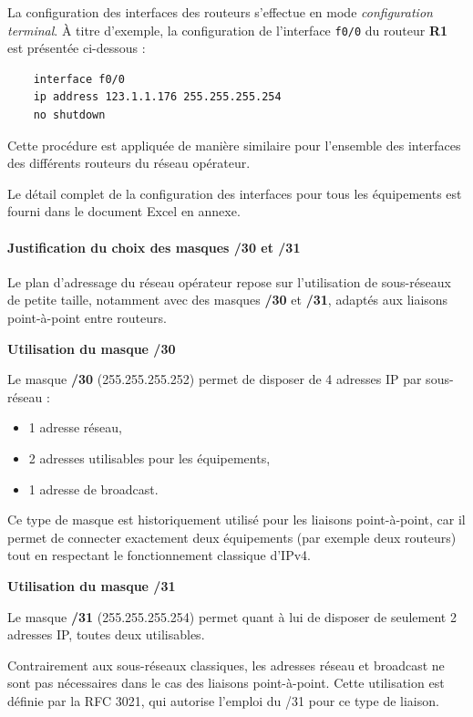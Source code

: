 \documentclass[12pt,a4paper, oneside]{memoir}
\begin{document}
La configuration des interfaces des routeurs s’effectue en mode \textit{configuration terminal}. À titre d’exemple, la configuration de l’interface \texttt{f0/0} du routeur \textbf{R1} est présentée ci-dessous :

\begin{verbatim}
	interface f0/0 
	ip address 123.1.1.176 255.255.255.254 
	no shutdown
\end{verbatim}

Cette procédure est appliquée de manière similaire pour l’ensemble des interfaces des différents routeurs du réseau opérateur.

Le détail complet de la configuration des interfaces pour tous les équipements est fourni dans le document Excel en annexe.
\paragraph{Justification du choix des masques /30 et /31}

Le plan d’adressage du réseau opérateur repose sur l’utilisation de sous-réseaux de petite taille, notamment avec des masques \textbf{/30} et \textbf{/31}, adaptés aux liaisons point-à-point entre routeurs.

\textbf{Utilisation du masque /30}

Le masque \textbf{/30} (255.255.255.252) permet de disposer de 4 adresses IP par sous-réseau :
\begin{itemize}
	\item 1 adresse réseau,
	\item 2 adresses utilisables pour les équipements,
	\item 1 adresse de broadcast.
\end{itemize}

Ce type de masque est historiquement utilisé pour les liaisons point-à-point, car il permet de connecter exactement deux équipements (par exemple deux routeurs) tout en respectant le fonctionnement classique d’IPv4.

\textbf{Utilisation du masque /31}

Le masque \textbf{/31} (255.255.255.254) permet quant à lui de disposer de seulement 2 adresses IP, toutes deux utilisables.

Contrairement aux sous-réseaux classiques, les adresses réseau et broadcast ne sont pas nécessaires dans le cas des liaisons point-à-point. Cette utilisation est définie par la RFC 3021, qui autorise l’emploi du /31 pour ce type de liaison.
\end{document}
